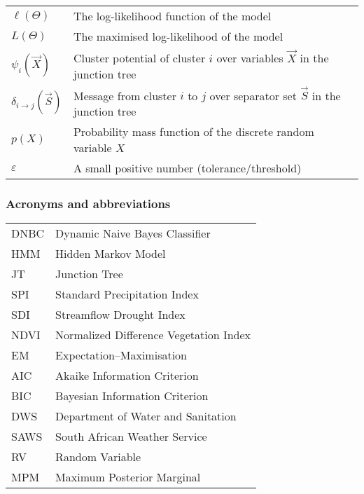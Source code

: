 \begin{tabularx}{\textwidth}{@{}p{2.5cm}L}
    $\ell(\Theta)$ & The log-likelihood function of the model \\
    $L(\Theta)$ & The maximised log-likelihood of the model \\

    $\psi_i(\vec{X})$ & Cluster potential of cluster $i$ over variables $\vec{X}$ in the junction tree \\
    $\delta_{i \rightarrow j}(\vec{S})$ & Message from cluster $i$ to $j$ over separator set $\vec{S}$ in the junction tree \\

    $p(X)$ & Probability mass function of the discrete random variable $X$ \\
    $\varepsilon$ & A small positive number (tolerance/threshold) \\
\end{tabularx}
\endgroup


\newpage
\subsubsection*{Acronyms and abbreviations}

\begingroup
\renewcommand{\arraystretch}{1.2}
\begin{tabular}{@{}p{2.5cm} l}
    DNBC    & Dynamic Naive Bayes Classifier \\
    HMM    & Hidden Markov Model \\
    JT    & Junction Tree \\
    SPI    & Standard Precipitation Index \\
    SDI    & Streamflow Drought Index \\
    NDVI    & Normalized Difference Vegetation Index \\
    EM      & Expectation–Maximisation \\
    AIC & Akaike Information Criterion \\
    BIC & Bayesian Information Criterion \\
    DWS & Department of Water and Sanitation \\
    SAWS & South African Weather Service \\
    RV & Random Variable \\
    MPM & Maximum Posterior Marginal  \\
\end{tabular}
\endgroup
